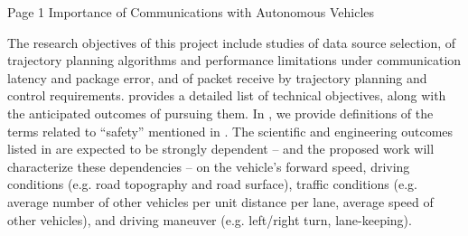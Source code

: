 Page 1 Importance of Communications with Autonomous Vehicles



The research objectives of this project include studies of data source selection, of 
trajectory planning algorithms and performance limitations under communication latency and package error, and of 
packet receive by trajectory planning and control requirements.
 provides a detailed list of technical objectives, along with 
the anticipated outcomes of pursuing them. 
In , we provide definitions 
of the terms related to ``safety'' mentioned in .
The scientific and 
engineering outcomes listed in  are expected to be strongly dependent -- 
and the proposed work will characterize these dependencies -- on 
the vehicle's forward speed, driving conditions (e.g. road topography and road surface), 
traffic conditions (e.g. average number of other vehicles per unit distance per lane, average 
speed of other vehicles), and driving maneuver (e.g. left/right turn, lane-keeping).